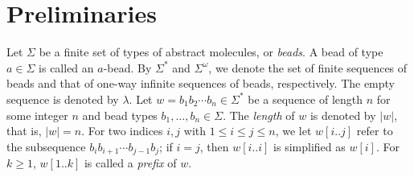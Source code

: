 \documentclass[runningheads]{llncs}
\begin{document}
	\section{Preliminaries}\label{sec:preliminaries}

Let $\Sigma$ be a finite set of types of abstract molecules, or \textit{beads}. 
A bead of type $a \in \Sigma$ is called an $a$-bead. 
By $\Sigma^*$ and $\Sigma^\omega$, we denote the set of finite sequences of beads and that of one-way infinite sequences of beads, respectively. 
The empty sequence is denoted by $\lambda$. 
Let $w = b_1 b_2 \cdots b_n \in \Sigma^*$ be a sequence of length $n$ for some integer $n$ and bead types $b_1, \ldots, b_n \in \Sigma$. 
The \textit{length} of $w$ is denoted by $|w|$, that is, $|w| = n$. 
For two indices $i, j$ with $1 \le i \le j \le n$, we let $w[i..j]$ refer to the subsequence $b_i b_{i+1} \cdots b_{j-1}b_j$; if $i = j$, then $w[i..i]$ is simplified as $w[i]$. 
For $k \ge 1$, $w[1..k]$ is called a \textit{prefix} of $w$. 
\end{document}
